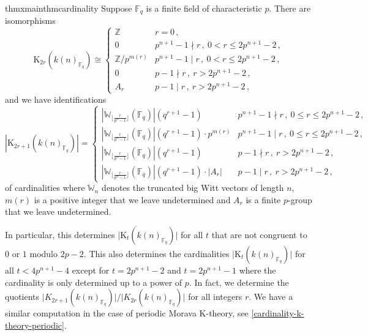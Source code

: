 \documentclass[english,10pt]{amsart}
\newcommand{\field}{\mathbb{F}}
\theoremstyle{definition}
\numberwithin{equation}{section}
\begin{document}
\begin{restatable}{thmx}{mainthmcardinality}\label{cardinality-k-theory}
Suppose $\field_{q}$ is a finite field of characteristic $p$. There are isomorphisms 
\[ 
\mathrm{K}_{2r}(k(n)_{\field_{q}
})\cong \begin{cases} \mathbb{Z} & r=0  \,,\\ 
    0  &  p^{n+1}-1\nmid r\,, \ 0<r\leq2p^{n+1}-2  \,,\\
          \mathbb{Z}/p^{m(r)} &  p^{n+1}-1\mid r\,,\ 0<r\le 2p^{n+1}-2  \,,\\
    0 & p-1 \nmid r\,, \ r> 2p^{n+1}-2  \,,\\
     A_{r}  &  p-1\mid r\,,  \ r> 2p^{n+1}-2 \,,
     \end{cases}
\]
and we have identifications 
\[ 
|\mathrm{K}_{2r+1}(k(n)_{\field_q})|=\begin{cases}
 |\mathbb{W}_{\lfloor \frac{r}{p^{n}-1}\rfloor}(\field_q)|(q^{r+1}-1) & p^{n+1}-1\nmid r \,, \ 0 \le  r\le 2p^{n+1}-2 \,,\\
       |\mathbb{W}_{\lfloor \frac{r}{p^{n}-1}\rfloor}(\field_q)|(q^{r+1}-1)\cdot p^{m(r)} & p^{n+1}-1\mid r \,, \ 0 \le r\le 2p^{n+1}-2 \,,\\
         |\mathbb{W}_{\lfloor \frac{r}{p^{n}-1}\rfloor}(\field_q)|(q^{r+1}-1) & p-1\nmid r \,, \ r> 2p^{n+1}-2 \,,\\
    |\mathbb{W}_{\lfloor \frac{r}{p^{n}-1}\rfloor}(\field_q)|(q^{r+1}-1)\cdot \lvert A_r\rvert 
    & p-1\mid r \,, \ r>2p^{n+1}-2 \,,
\end{cases}
\]
of cardinalities where $\mathbb{W}_n$ denotes the truncated big Witt vectors of length $n$, $m(r)$ is a positive integer that we leave undetermined and $A_{r}$ is a finite $p$-group that we leave undetermined. 
\end{restatable}

In particular, this determines $\lvert \mathrm{K}_{t}(k(n)_{\field_q})\rvert$ for all $t$ that are  not congruent to $0$ or $1$ modulo $2p-2$. This also determines the cardinalities  $\lvert \mathrm{K}_{t}(k(n)_{\field_q}) \rvert$ for all $t<4p^{n+1}-4$ except for $t = 2p^{n+1}-2$ and $t= 2p^{n+1}-1$ where the cardinality is only determined up to a power of $p$.
In fact, we determine the quotients $\lvert K_{2r+1}(k(n)_{\field_q})\rvert/\lvert K_{2r}(k(n)_{\field_q})\rvert$ for all integers $r$. We have a similar computation in the case of periodic Morava K-theory, see \autoref{cardinality-k-theory-periodic}.  
\end{document}
